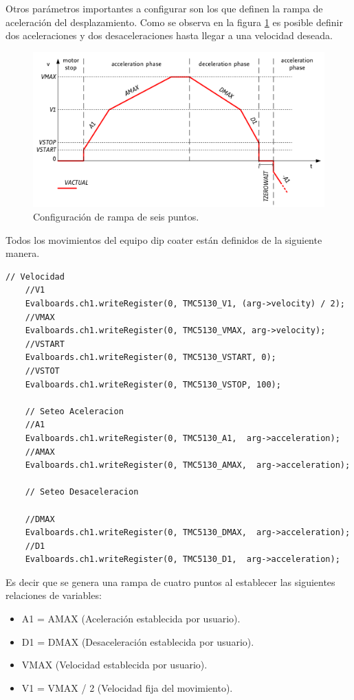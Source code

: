 Otros parámetros importantes a configurar son los que definen la rampa de aceleración del desplazamiento. 
Como se observa en la figura \ref{fig:rampa} es posible definir dos aceleraciones y dos desaceleraciones hasta llegar a una velocidad deseada.  
\begin{figure}[h!]
	\centering
	\includegraphics[width=1\textwidth]{./Figures/rampa_1.png}
	\caption{Configuración de rampa de seis puntos.}
	\label{fig:rampa}
\end{figure}

Todos los movimientos del equipo dip coater están definidos de la siguiente manera.
\begin{lstlisting}[label=cod:vControl,caption=Macros para configurar de desplazamientos.] 
	// Velocidad
	//V1
	Evalboards.ch1.writeRegister(0, TMC5130_V1, (arg->velocity) / 2);
	//VMAX
	Evalboards.ch1.writeRegister(0, TMC5130_VMAX, arg->velocity);
	//VSTART
	Evalboards.ch1.writeRegister(0, TMC5130_VSTART, 0);
	//VSTOT
	Evalboards.ch1.writeRegister(0, TMC5130_VSTOP, 100);

	// Seteo Aceleracion
	//A1
	Evalboards.ch1.writeRegister(0, TMC5130_A1,  arg->acceleration);
	//AMAX
	Evalboards.ch1.writeRegister(0, TMC5130_AMAX,  arg->acceleration);

	// Seteo Desaceleracion

	//DMAX
	Evalboards.ch1.writeRegister(0, TMC5130_DMAX,  arg->acceleration);
	//D1
	Evalboards.ch1.writeRegister(0, TMC5130_D1,  arg->acceleration);
\end{lstlisting}

Es decir que se genera una rampa de cuatro puntos al establecer las siguientes relaciones de variables:
\begin{itemize}
\item A1 = AMAX  (Aceleración establecida por usuario).
\item D1 = DMAX  (Desaceleración establecida por usuario).
\item VMAX 	  (Velocidad establecida por usuario).
\item V1 = VMAX / 2 (Velocidad fija del movimiento).

\end{itemize}


